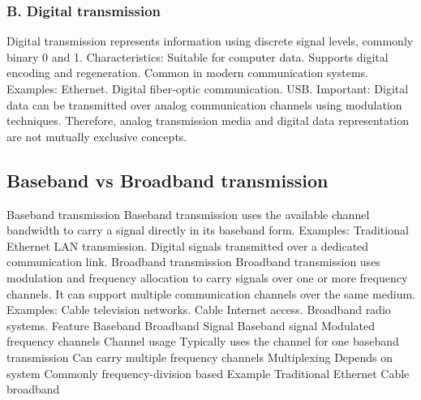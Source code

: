 \subsubsection{B. Digital transmission}
Digital transmission represents information using discrete signal levels, commonly binary 0 and 1.
Characteristics:
Suitable for computer data.
Supports digital encoding and regeneration.
Common in modern communication systems.
Examples:
Ethernet.
Digital fiber-optic communication.
USB.
Important: Digital data can be transmitted over analog communication channels using modulation techniques. Therefore, analog transmission media and digital data representation are not mutually exclusive concepts.
\subsection{Baseband vs Broadband transmission}
Baseband transmission
Baseband transmission uses the available channel bandwidth to carry a signal directly in its baseband form.
Examples:
Traditional Ethernet LAN transmission.
Digital signals transmitted over a dedicated communication link.
Broadband transmission
Broadband transmission uses modulation and frequency allocation to carry signals over one or more frequency channels.
It can support multiple communication channels over the same medium.
Examples:
Cable television networks.
Cable Internet access.
Broadband radio systems.
Feature
Baseband
Broadband
Signal
Baseband signal
Modulated frequency channels
Channel usage
Typically uses the channel for one baseband transmission
Can carry multiple frequency channels
Multiplexing
Depends on system
Commonly frequency-division based
Example
Traditional Ethernet
Cable broadband
